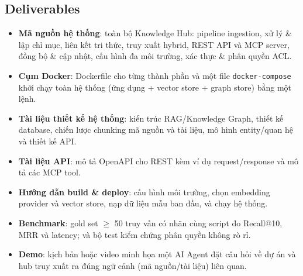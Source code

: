 \subsection{Deliverables}

\begin{itemize}
  \item \textbf{Mã nguồn hệ thống}: toàn bộ Knowledge Hub: pipeline ingestion, xử lý \& lập chỉ mục, liên kết tri thức, truy xuất hybrid, REST API và MCP server, đồng bộ \& cập nhật, cấu hình đa môi trường, xác thực \& phân quyền ACL.
  \item \textbf{Cụm Docker}: Dockerfile cho từng thành phần và một file \texttt{docker-compose} khởi chạy toàn hệ thống (ứng dụng + vector store + graph store) bằng một lệnh.
  \item \textbf{Tài liệu thiết kế hệ thống}: kiến trúc RAG/Knowledge Graph, thiết kế database, chiến lược chunking mã nguồn và tài liệu, mô hình entity/quan hệ và thiết kế API.
  \item \textbf{Tài liệu API}: mô tả OpenAPI cho REST kèm ví dụ request/response và mô tả các MCP tool.
  \item \textbf{Hướng dẫn build \& deploy}: cấu hình môi trường, chọn embedding provider và vector store, nạp dữ liệu mẫu ban đầu, và chạy hệ thống.
  \item \textbf{Benchmark}: gold set $\geq$ 50 truy vấn có nhãn cùng script đo Recall@10, MRR và latency; và bộ test kiểm chứng phân quyền không rò rỉ.
  \item \textbf{Demo}: kịch bản hoặc video minh họa một AI Agent đặt câu hỏi về dự án và hub truy xuất ra đúng ngữ cảnh (mã nguồn/tài liệu) liên quan.
\end{itemize}